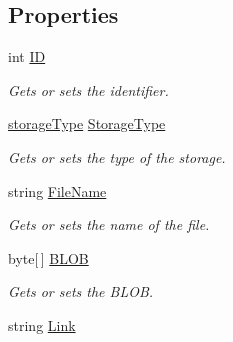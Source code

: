 \subsection*{Properties}
\begin{DoxyCompactItemize}
\item 
int \hyperlink{class_open_1_1_g_i_1_1hypermart_1_1_data_transformation_objects_1_1_file_d_t_o_ab187e7f070650067d055de8f707e1eed}{I\+D}
\begin{DoxyCompactList}\small\item\em Gets or sets the identifier. \end{DoxyCompactList}\item 
\hyperlink{namespace_open_1_1_g_i_1_1hypermart_1_1_models_a21c5ffa7da75ad8a6d2b04798113f9db}{storage\+Type} \hyperlink{class_open_1_1_g_i_1_1hypermart_1_1_data_transformation_objects_1_1_file_d_t_o_a4563713ee116eb1163eaac1f242b395f}{Storage\+Type}
\begin{DoxyCompactList}\small\item\em Gets or sets the type of the storage. \end{DoxyCompactList}\item 
string \hyperlink{class_open_1_1_g_i_1_1hypermart_1_1_data_transformation_objects_1_1_file_d_t_o_a55fb34aacab9513037108ff3f1d287a8}{File\+Name}
\begin{DoxyCompactList}\small\item\em Gets or sets the name of the file. \end{DoxyCompactList}\item 
byte\mbox{[}$\,$\mbox{]} \hyperlink{class_open_1_1_g_i_1_1hypermart_1_1_data_transformation_objects_1_1_file_d_t_o_af2ebb686a878cb8342e76648d048f19a}{B\+L\+O\+B}
\begin{DoxyCompactList}\small\item\em Gets or sets the B\+L\+O\+B. \end{DoxyCompactList}\item 
string \hyperlink{class_open_1_1_g_i_1_1hypermart_1_1_data_transformation_objects_1_1_file_d_t_o_af58091e5ba2e9fde7db92f08dc4d3a41}{Link}

\end{DoxyCompactItemize}
